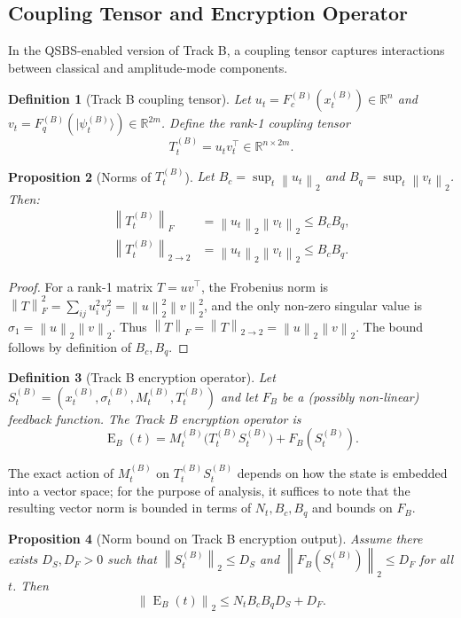 \documentclass[11pt]{article}
\newtheorem{definition}{Definition}[section]
\newtheorem{proposition}[definition]{Proposition}
\newcommand{\R}{\mathbb{R}}
\DeclareMathOperator{\EncOp}{E}
\newcommand{\norm}[1]{\left\lVert #1 \right\rVert}
\begin{document}
\subsection{Coupling Tensor and Encryption Operator}

In the QSBS-enabled version of Track B, a coupling tensor captures interactions between classical and amplitude-mode components.

\begin{definition}[Track B coupling tensor]
Let \(u_t = F_c^{(B)}(x_t^{(B)}) \in \R^n\) and \(v_t = F_q^{(B)}(|\psi_t^{(B)}\rangle) \in \R^{2m}\).
Define the rank-1 coupling tensor
\[
  T_t^{(B)} = u_t v_t^\top \in \R^{n \times 2m}.
\]
\end{definition}

\begin{proposition}[Norms of \(T_t^{(B)}\)]
Let \(B_c = \sup_t \norm{u_t}_2\) and \(B_q = \sup_t \norm{v_t}_2\).
Then:
\begin{align*}
  \norm{T_t^{(B)}}_F &= \norm{u_t}_2 \norm{v_t}_2 \le B_c B_q, \\
  \norm{T_t^{(B)}}_{2\to 2} &= \norm{u_t}_2 \norm{v_t}_2 \le B_c B_q.
\end{align*}
\end{proposition}

\begin{proof}
For a rank-1 matrix \(T = u v^\top\), the Frobenius norm is
\(
\norm{T}_F^2 = \sum_{ij} u_i^2 v_j^2 = \norm{u}_2^2 \norm{v}_2^2
\),
and the only non-zero singular value is \(\sigma_1 = \norm{u}_2\norm{v}_2\).
Thus \(\norm{T}_F = \norm{T}_{2\to 2} = \norm{u}_2\norm{v}_2\).
The bound follows by definition of \(B_c,B_q\).
\end{proof}

\begin{definition}[Track B encryption operator]
Let \(S_t^{(B)} = (x_t^{(B)}, \sigma_t^{(B)}, M_t^{(B)}, T_t^{(B)})\) and let \(F_B\) be a (possibly non-linear) feedback function.
The Track B encryption operator is
\[
  \EncOp_B(t) = M_t^{(B)} \bigl( T_t^{(B)} S_t^{(B)} \bigr) + F_B(S_t^{(B)}).
\]
\end{definition}

The exact action of \(M_t^{(B)}\) on \(T_t^{(B)} S_t^{(B)}\) depends on how the state is embedded into a vector space;
for the purpose of analysis, it suffices to note that the resulting vector norm is bounded in terms of \(N_t, B_c, B_q\) and bounds on \(F_B\).

\begin{proposition}[Norm bound on Track B encryption output]
Assume there exists \(D_S, D_F > 0\) such that \(\norm{S_t^{(B)}}_2 \le D_S\) and \(\norm{F_B(S_t^{(B)})}_2 \le D_F\) for all \(t\).
Then
\[
  \norm{\EncOp_B(t)}_2 \le N_t B_c B_q D_S + D_F.
\]
\end{proposition}
\end{document}
